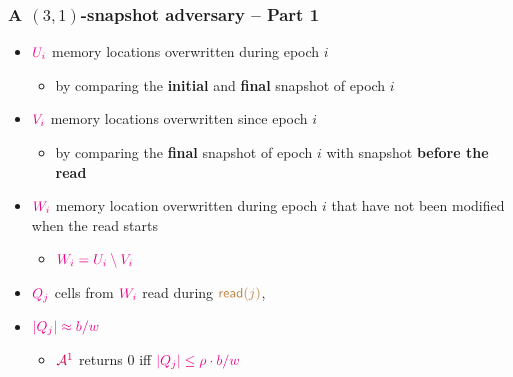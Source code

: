 \documentclass[]{beamer}
\newcommand{\calA}{\mathcal{A}}
\begin{document}
\begin{frame}
\frametitle{A $(3,1)$-snapshot adversary -- Part 1}

\begin{itemize}
\item $\color{magenta} U_i$ memory locations 
                overwritten during epoch $i$
    \begin{itemize}
        \item by comparing the {\color{brown} \bf initial}
        and {\color{brown}\bf final} snapshot of epoch $i$
    \end{itemize}
\item $\color{magenta} V_i$ memory locations overwritten since epoch $i$
    \begin{itemize}
        \item by comparing the {\color{brown}\bf final} snapshot of epoch $i$ 
    with snapshot {\color{brown} \bf before the read}
    \end{itemize}
\item $\color{magenta} W_i$ memory location overwritten during epoch $i$
that have not been modified when the read starts
    \begin{itemize}
        \item $\color{magenta} W_i=U_i\setminus V_i$
    \end{itemize}
\item $\color{magenta}Q_j$  cells from $\color{magenta}W_i$ read during
$\color{brown}\mathsf{read}(j)$, 
\item $\color{magenta} |Q_j|\approx b/w$ 
    \begin{itemize}
        \item $\color{purple}\calA^1$ returns 0 iff 
            $\color{magenta} |Q_j|\leq \rho\cdot b/w$ 
    \end{itemize}
\end{itemize}
\end{frame}
\end{document}
